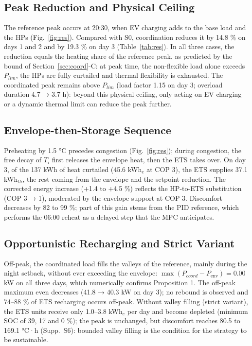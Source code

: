 \documentclass[conference]{IEEEtran}
\newcommand{\Penv}{P_{\mathrm{env}}}      %
\newcommand{\Supp}[1]{Supp.~S#1}          %
\begin{document}
\subsection{Peak Reduction and Physical Ceiling}

The reference peak occurs at 20:30, when EV charging adds to the base load and the HPs (Fig.~\ref{fig:res}). Compared with S0, coordination reduces it by 14.8 \% on days 1 and 2 and by 19.3 \% on day 3 (Table~\ref{tab:res}). In all three cases, the reduction equals the heating share of the reference peak, as predicted by the bound of Section~\ref{sec:coord}-C: at peak time, the non-flexible load alone exceeds $P_{lim}$, the HPs are fully curtailed and thermal flexibility is exhausted. The coordinated peak remains above $P_{lim}$ (load factor 1.15 on day 3; overload duration 4.7 → 3.7 h): beyond this physical ceiling, only acting on EV charging or a dynamic thermal limit can reduce the peak further.

\subsection{Envelope-then-Storage Sequence}

Preheating by 1.5 °C precedes congestion (Fig.~\ref{fig:res}); during congestion, the free decay of $T_i$ first releases the envelope heat, then the ETS takes over. On day 3, of the 137 kWh of heat curtailed (45.6 kWh$_e$ at COP 3), the ETS supplies 37.1 kWh$_{th}$, the rest coming from the envelope and the setpoint reduction. The corrected energy increase (+1.4 to +4.5 \%) reflects the HP-to-ETS substitution (COP 3 → 1), moderated by the envelope support at COP 3. Discomfort decreases by 82 to 99 \%; part of this gain stems from the PID reference, which performs the 06:00 reheat as a delayed step that the MPC anticipates.

\subsection{Opportunistic Recharging and Strict Variant}

Off-peak, the coordinated load fills the valleys of the reference, mainly during the night setback, without ever exceeding the envelope: $\max(P_{coord}-\Penv)=0.00$ kW on all three days, which numerically confirms Proposition 1. The off-peak maximum even decreases (41.8 → 40.3 kW on day 3); no rebound is observed and 74--88 \% of ETS recharging occurs off-peak. Without valley filling (strict variant), the ETS units receive only 1.0--3.8 kWh$_e$ per day and become depleted (minimum SOC of 39, 17 and 0 \%); the peak is unchanged, but discomfort reaches 80.5 to 169.1 °C·h (\Supp{6}): bounded valley filling is the condition for the strategy to be sustainable.
\end{document}
